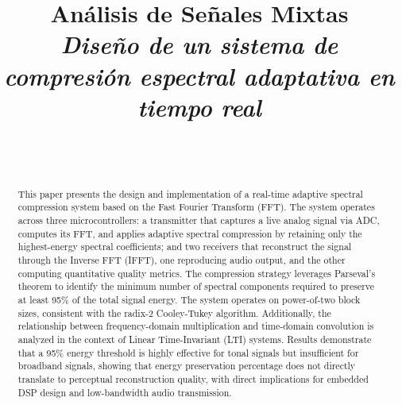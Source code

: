 \documentclass[12pt, journal]{IEEEtran}
\begin{document}

\title{Análisis de Señales Mixtas \\ \textit{Diseño de un sistema de compresión espectral adaptativa en tiempo real} }


\author{
 \\ 
\vspace{\baselineskip}\\
}

\maketitle

\begin{abstract}
This paper presents the design and implementation of a real-time adaptive spectral compression system based on the Fast Fourier Transform (FFT). The system operates across three microcontrollers: a transmitter that captures a live analog signal via ADC, computes its FFT, and applies adaptive spectral compression by retaining only the highest-energy spectral coefficients; and two receivers that reconstruct the signal through the Inverse FFT (IFFT), one reproducing audio output, and the other computing quantitative quality metrics. The compression strategy leverages Parseval's theorem to identify the minimum number of spectral components required to preserve at least 95\% of the total signal energy. The system operates on power-of-two block sizes, consistent with the radix-2 Cooley-Tukey algorithm. Additionally, the relationship between frequency-domain multiplication and time-domain convolution is analyzed in the context of Linear Time-Invariant (LTI) systems. Results demonstrate that a 95\% energy threshold is highly effective for tonal signals but insufficient for broadband signals, showing that energy preservation percentage does not directly translate to perceptual reconstruction quality, with direct implications for embedded DSP design and low-bandwidth audio transmission.
\end{abstract}
 
\end{document}
